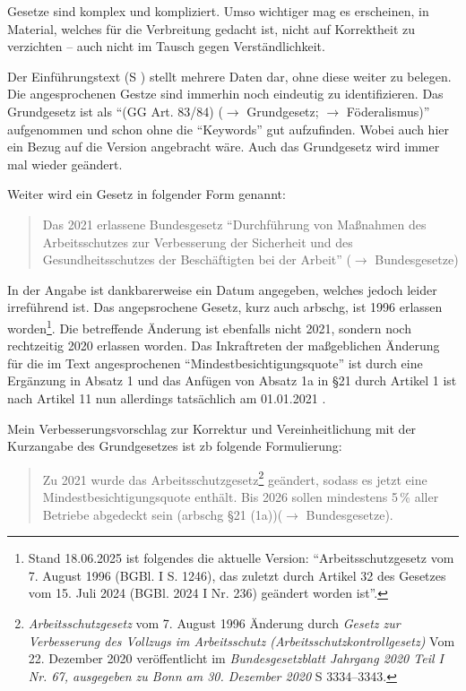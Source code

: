 Gesetze sind komplex und kompliziert. Umso wichtiger mag es erscheinen, in Material, welches für die Verbreitung gedacht ist, nicht auf Korrektheit zu verzichten -- auch nicht im Tausch gegen Verständlichkeit.





Der Einführungstext (\gls{S} \pageref{DEMOKRATIE-A1}) stellt mehrere Daten dar, ohne diese weiter zu belegen.
Die angesprochenen Gestze sind immerhin noch eindeutig zu identifizieren. Das Grundgesetz ist als \enquote{(GG Art. 83/84) ($\rightarrow$ Grundgesetz; $\rightarrow$ Föderalismus)} aufgenommen und schon ohne die \enquote{Keywords} gut aufzufinden. Wobei auch hier ein Bezug auf die Version angebracht wäre. Auch das Grundgesetz wird immer mal wieder geändert.  

Weiter wird ein Gesetz in folgender Form genannt: 
\begin{quote}
    Das 2021 erlassene Bundesgesetz \enquote{Durchführung von Maßnahmen des Arbeitsschutzes zur  Verbesserung der Sicherheit und des Gesundheitsschutzes der Beschäftigten bei der Arbeit} ($\rightarrow$ Bundesgesetze)
\end{quote}

In der Angabe ist dankbarerweise ein Datum angegeben, welches jedoch leider irreführend ist. Das angepsrochene Gesetz, kurz auch \gls{arbschg}, ist 1996 erlassen worden\footnote{Stand 18.06.2025 ist folgendes die aktuelle Version: \enquote{Arbeitsschutzgesetz vom 7. August 1996 (BGBl. I S. 1246), das zuletzt durch Artikel 32 des Gesetzes vom 15. Juli 2024 (BGBl. 2024 I Nr. 236) geändert worden ist}.}. Die betreffende Änderung ist ebenfalls nicht 2021, sondern noch rechtzeitig 2020 erlassen worden. Das Inkraftreten der maßgeblichen Änderung für die im Text angesprochenen \enquote{Mindestbesichtigungsquote} ist durch eine Ergänzung in Absatz 1 und das Anfügen von Absatz 1a in §21 %
durch Artikel 1 ist nach Artikel 11 nun allerdings tatsächlich am 01.01.2021 \autocite[3334–3343]{BGBl.2020-I-Nr67}. 

Mein Verbesserungsvorschlag zur Korrektur und Vereinheitlichung mit der Kurzangabe des Grundgesetzes ist \gls{zb} folgende Formulierung:
\begin{quote}
Zu 2021 wurde das Arbeitsschutzgesetz\footnote{
    \emph{Arbeitsschutzgesetz} vom 7. August 1996 Änderung durch \emph{Gesetz zur Verbesserung des Vollzugs im Arbeitsschutz (Arbeitsschutzkontrollgesetz)} Vom 22. Dezember 2020 veröffentlicht im \emph{Bundesgesetzblatt Jahrgang 2020 Teil I Nr. 67, ausgegeben zu Bonn am 30. Dezember 2020} \gls{S} 3334–3343.\label{ArbschSchGfooty}} 
    geändert, sodass es jetzt eine Mindestbesichtigungsquote enthält. %
    Bis 2026 sollen mindestens 5\,\% aller Betriebe abgedeckt sein (\gls{arbschg} §21 (1a))($\rightarrow$ Bundesgesetze). 
\end{quote}

